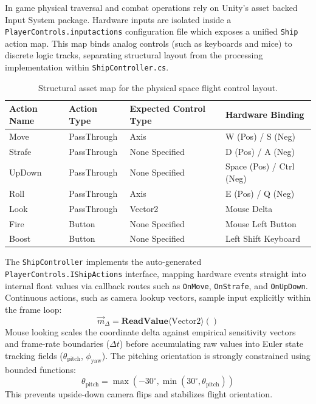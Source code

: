 \documentclass[12pt]{report}
\begin{document}
In game physical traversal and combat operations rely on Unity's asset backed Input System package. Hardware inputs are isolated inside a \texttt{PlayerControls.inputactions} configuration file which exposes a unified \texttt{Ship} action map. This map binds analog controls (such as keyboards and mice) to discrete logic tracks, separating structural layout from the processing implementation within \texttt{ShipController.cs}.

\begin{table}[h!]
\centering
\small
\begin{tabular}{|l|l|l|l|}
\hline
\textbf{Action Name} & \textbf{Action Type} & \textbf{Expected Control Type} & \textbf{Hardware Binding} \\ \hline
Move                 & PassThrough          & Axis                           & W (Pos) / S (Neg) \\ \hline
Strafe               & PassThrough          & None Specified                 & D (Pos) / A (Neg) \\ \hline
UpDown               & PassThrough          & None Specified                 & Space (Pos) / Ctrl (Neg) \\ \hline
Roll                 & PassThrough          & Axis                           & E (Pos) / Q (Neg) \\ \hline
Look                 & PassThrough          & Vector2                        & Mouse Delta \\ \hline
Fire                 & Button               & None Specified                 & Mouse Left Button \\ \hline
Boost                & Button               & None Specified                 & Left Shift Keyboard \\ \hline
\end{tabular}
\caption{Structural asset map for the physical space flight control layout.}
\label{table:input_mappings}
\end{table}

The \texttt{ShipController} implements the auto-generated \texttt{PlayerControls.IShipActions} interface, mapping hardware events straight into internal float values via callback routes such as \texttt{OnMove}, \texttt{OnStrafe}, and \texttt{OnUpDown}. Continuous actions, such as camera lookup vectors, sample input explicitly within the frame loop:
\begin{equation}
\vec{m}_{\Delta} = \mathbf{ReadValue}\langle\text{Vector2}\rangle()
\end{equation}
Mouse looking scales the coordinate delta against empirical sensitivity vectors and frame-rate boundaries ($\Delta t$) before accumulating raw values into Euler state tracking fields ($\theta_{\text{pitch}}$, $\phi_{\text{yaw}}$). The pitching orientation is strongly constrained using bounded functions:
\begin{equation}
\theta_{\text{pitch}} = \max(-30^\circ, \min(30^\circ, \theta_{\text{pitch}}))
\end{equation}
This prevents upside-down camera flips and stabilizes flight orientation.
\end{document}
